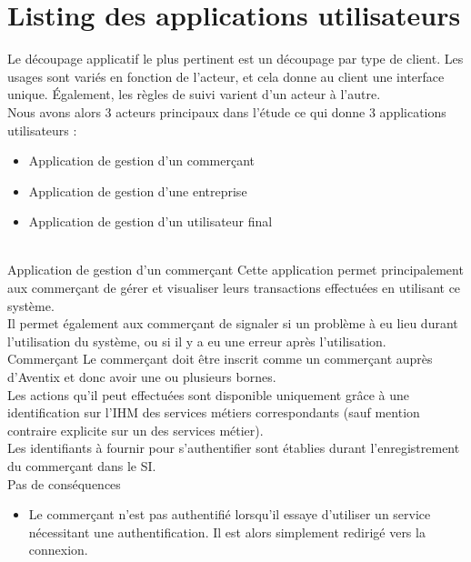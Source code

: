 
\section{Listing des applications utilisateurs}

Le découpage applicatif le plus pertinent est un découpage par type de client.
Les usages sont variés en fonction de l'acteur, et cela donne au client une
interface unique. Également, les règles de suivi varient d'un acteur à
l'autre.\\

Nous avons alors 3 acteurs principaux dans l'étude ce qui donne 3 applications
utilisateurs : \\
\begin{itemize}
  \item Application de gestion d'un commerçant
  \item Application de gestion d'une entreprise
  \item Application de gestion d'un utilisateur final
\end{itemize}
~\\

\CUBref
{Application de gestion d'un commerçant}
{
  Cette application permet principalement aux commerçant de gérer et visualiser
  leurs transactions effectuées en utilisant ce système. \\

  Il permet également aux commerçant de signaler si un problème à eu lieu
  durant l'utilisation du système, ou si il y a eu une erreur après
  l'utilisation. \\
}
{Commerçant}
{
  Le commerçant doit être inscrit comme un commerçant auprès d'Aventix et donc
  avoir une ou plusieurs bornes. \\

  Les actions qu'il peut effectuées sont disponible uniquement grâce à une
  identification sur l'IHM des services métiers correspondants (sauf mention
  contraire explicite sur un des services métier). \\

  Les identifiants à fournir pour s'authentifier sont établies durant
  l'enregistrement du commerçant dans le SI. \\
}
{Pas de conséquences}
{
  \begin{itemize}
    \item Le commerçant n'est pas authentifié lorsqu'il essaye d'utiliser un
      service nécessitant une authentification. Il est alors simplement redirigé
      vers la connexion.
  \end{itemize}
}

